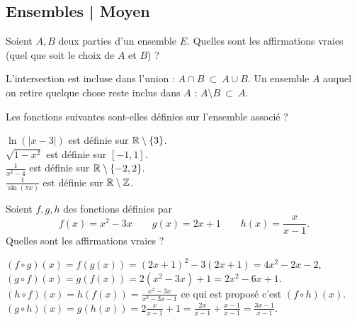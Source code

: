 \subsection{Ensembles | Moyen}

\begin{question}
Soient $A,B$ deux parties d'un ensemble $E$.
Quelles sont les affirmations vraies (quel que soit le choix de $A$ et $B$) ?
\begin{answers} 
\end{answers}
\begin{explanations}
L'intersection est incluse dans l'union :  $A \cap B \ \subset \ A \cup B$.
Un ensemble $A$ auquel on retire quelque chose reste inclus dans $A$ : $A \setminus B \ \subset \ A$.
\end{explanations}
\end{question}


\begin{question}
Les fonctions suivantes sont-elles définies sur l'ensemble associé ?
\begin{answers} 
\end{answers}
\begin{explanations} 
$\ln(|x-3|)$ est définie sur $\mathbb{R} \setminus \{ 3 \}$.\\
$\sqrt{1-x^2}$ est définie sur $[-1,1]$.\\
$\frac{1}{x^2-4}$ est définie sur $\mathbb{R} \setminus \{ -2, 2 \}$.\\
$\frac{1}{\sin(\pi x)}$ est définie sur $\mathbb{R} \setminus \mathbb{Z}$.
\end{explanations}
\end{question}


\begin{question}
Soient $f,g,h$ des fonctions définies par 
$$f(x) = x^2-3x \qquad g(x) = 2x+1 \qquad h(x) = \frac{x}{x-1}.$$
Quelles sont les affirmations vraies ?
\begin{answers} 
\end{answers}
\begin{explanations} 
$(f \circ g)(x) = f(g(x)) = (2x+1)^2-3(2x+1) = 4x^2-2x-2$, \\
$(g \circ f)(x) = g(f(x)) = 2(x^2-3x)+1 = 2x^2-6x+1$. \\
$(h \circ f)(x) = h(f(x)) = \frac{x^2-3x}{x^2-3x-1}$ ce qui est proposé c'est $(f \circ h)(x)$.\\
$(g \circ h)(x) = g(h(x)) = 2\frac{x}{x-1} +1 = \frac{2x}{x-1} + \frac{x-1}{x-1} = \frac{3x-1}{x-1}$.
\end{explanations}
\end{question}


